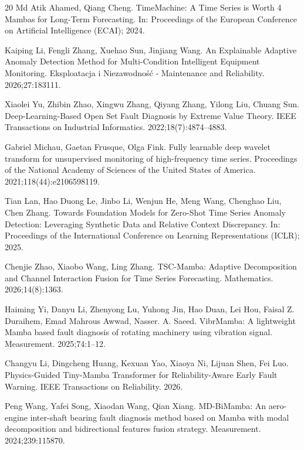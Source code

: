 \documentclass[runningheads]{llncs}
\begin{document}
\begin{thebibliography}{20}
Md Atik Ahamed, Qiang Cheng. TimeMachine: A Time Series is Worth 4 Mambas for Long-Term Forecasting. In: Proceedings of the European Conference on Artificial Intelligence (ECAI); 2024. 

Kaiping Li, Fengli Zhang, Xuehao Sun, Jinjiang Wang. An Explainable Adaptive Anomaly Detection Method for Multi-Condition Intelligent Equipment Monitoring. Eksploatacja i Niezawodno\'s\'c - Maintenance and Reliability. 2026;27:183111. 

Xiaolei Yu, Zhibin Zhao, Xingwu Zhang, Qiyang Zhang, Yilong Liu, Chuang Sun. Deep-Learning-Based Open Set Fault Diagnosis by Extreme Value Theory. IEEE Transactions on Industrial Informatics. 2022;18(7):4874--4883. 

Gabriel Michau, Gaetan Frusque, Olga Fink. Fully learnable deep wavelet transform for unsupervised monitoring of high-frequency time series. Proceedings of the National Academy of Sciences of the United States of America. 2021;118(44):e2106598119. 

Tian Lan, Hao Duong Le, Jinbo Li, Wenjun He, Meng Wang, Chenghao Liu, Chen Zhang. Towards Foundation Models for Zero-Shot Time Series Anomaly Detection: Leveraging Synthetic Data and Relative Context Discrepancy. In: Proceedings of the International Conference on Learning Representations (ICLR); 2025. 

Chenjie Zhao, Xiaobo Wang, Ling Zhang. TSC-Mamba: Adaptive Decomposition and Channel Interaction Fusion for Time Series Forecasting. Mathematics. 2026;14(8):1363. 

Haiming Yi, Danyu Li, Zhenyong Lu, Yuhong Jin, Hao Duan, Lei Hou, Faisal Z. Duraihem, Emad Mahrous Awwad, Nasser. A. Saeed. VibrMamba: A lightweight Mamba based fault diagnosis of rotating machinery using vibration signal. Measurement. 2025;74:1--12. 

Changyu Li, Dingcheng Huang, Kexuan Yao, Xiaoya Ni, Lijuan Shen, Fei Luo. Physics-Guided Tiny-Mamba Transformer for Reliability-Aware Early Fault Warning. IEEE Transactions on Reliability. 2026. 

Peng Wang, Yafei Song, Xiaodan Wang, Qian Xiang. MD-BiMamba: An aero-engine inter-shaft bearing fault diagnosis method based on Mamba with modal decomposition and bidirectional features fusion strategy. Measurement. 2024;239:115870. 


\end{thebibliography}
\end{document}
